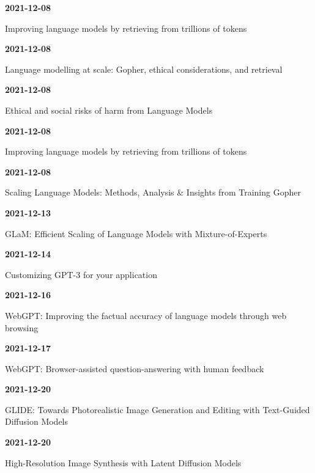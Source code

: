 \smallskip
\noindent\textbf{2021-12-08}\par
{\raggedright Improving language models by retrieving from trillions of tokens\par}
\smallskip
\noindent\textbf{2021-12-08}\par
{\raggedright Language modelling at scale: Gopher, ethical considerations, and retrieval\par}
\smallskip
\noindent\textbf{2021-12-08}\par
{\raggedright Ethical and social risks of harm from Language Models\par}
\smallskip
\noindent\textbf{2021-12-08}\par
{\raggedright Improving language models by retrieving from trillions of tokens\par}
\smallskip
\noindent\textbf{2021-12-08}\par
{\raggedright Scaling Language Models: Methods, Analysis \& Insights from Training Gopher\par}
\smallskip
\noindent\textbf{2021-12-13}\par
{\raggedright GLaM: Efficient Scaling of Language Models with Mixture-of-Experts\par}
\smallskip
\noindent\textbf{2021-12-14}\par
{\raggedright Customizing GPT-3 for your application\par}
\smallskip
\noindent\textbf{2021-12-16}\par
{\raggedright WebGPT: Improving the factual accuracy of language models through web browsing\par}
\smallskip
\noindent\textbf{2021-12-17}\par
{\raggedright WebGPT: Browser-assisted question-answering with human feedback\par}
\smallskip
\noindent\textbf{2021-12-20}\par
{\raggedright GLIDE: Towards Photorealistic Image Generation and Editing with Text-Guided Diffusion Models\par}
\smallskip
\noindent\textbf{2021-12-20}\par
{\raggedright High-Resolution Image Synthesis with Latent Diffusion Models\par}
\smallskip
